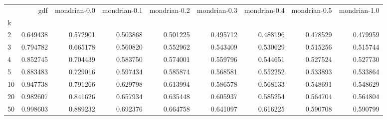 \begin{tabular}{lrrrrrrrr}
\toprule
{} &       gdf &  mondrian-0.0 &  mondrian-0.1 &  mondrian-0.2 &  mondrian-0.3 &  mondrian-0.4 &  mondrian-0.5 &  mondrian-1.0 \\
k  &           &               &               &               &               &               &               &               \\
\midrule
2  &  0.649438 &      0.572901 &      0.503868 &      0.501225 &      0.495712 &      0.488196 &      0.478529 &      0.479959 \\
3  &  0.794782 &      0.665178 &      0.560820 &      0.552962 &      0.543409 &      0.530629 &      0.515256 &      0.515744 \\
4  &  0.852745 &      0.704439 &      0.583750 &      0.574001 &      0.559796 &      0.544651 &      0.527524 &      0.527730 \\
5  &  0.883483 &      0.729016 &      0.597434 &      0.585874 &      0.568581 &      0.552252 &      0.533893 &      0.533864 \\
10 &  0.947738 &      0.791266 &      0.629798 &      0.613994 &      0.586578 &      0.568133 &      0.548691 &      0.548629 \\
20 &  0.982607 &      0.841626 &      0.657934 &      0.635448 &      0.605937 &      0.585254 &      0.564704 &      0.564804 \\
50 &  0.998603 &      0.889232 &      0.692376 &      0.664758 &      0.641097 &      0.616225 &      0.590708 &      0.590799 \\
\bottomrule
\end{tabular}
